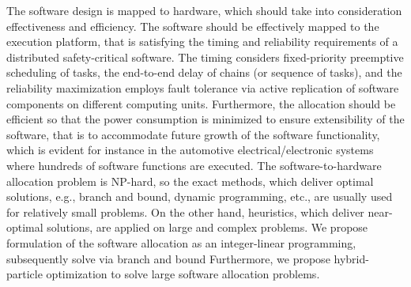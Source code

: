 The software design is mapped to hardware, which should take into consideration effectiveness and efficiency. The software should be effectively mapped to the execution platform, that is satisfying the timing and reliability requirements of a distributed safety-critical software. The timing considers fixed-priority preemptive scheduling of tasks, the end-to-end delay of chains (or sequence of tasks), and the reliability maximization employs fault tolerance via active replication of software components on different computing units. Furthermore, the allocation should be efficient so that the power consumption is minimized to ensure extensibility of the software, that is to accommodate future growth of the software functionality, which is evident for instance in the automotive electrical/electronic systems where hundreds of software functions are executed. The software-to-hardware allocation problem is NP-hard, so the exact methods, which deliver optimal solutions, e.g., branch and bound, dynamic programming, etc., are usually used for relatively small problems. On the other hand, heuristics, which deliver near-optimal solutions, are applied on large and complex problems. We propose formulation of the software allocation as an integer-linear programming, subsequently solve via branch and bound Furthermore, we propose hybrid-particle optimization to solve large software allocation problems.

